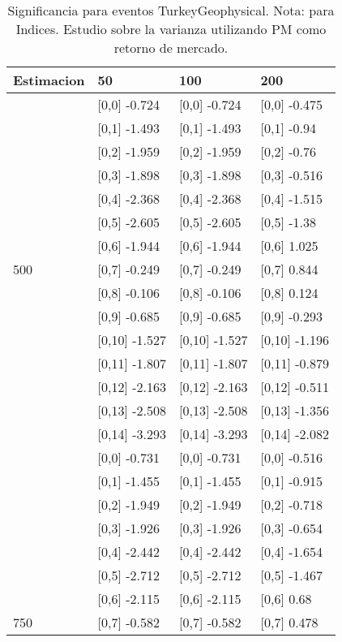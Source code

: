 \begin{table}

\caption{Significancia para eventos TurkeyGeophysical. Nota: para Indices. Estudio sobre la varianza utilizando PM como retorno de mercado.}
\centering
\begin{tabular}[t]{llll}
\toprule
Estimacion & 50 & 100 & 200\\
\midrule
 & {}[0,0] -0.724 & {}[0,0] -0.724 & {}[0,0] -0.475\\
 & {}[0,1] -1.493 & {}[0,1] -1.493 & {}[0,1] -0.94\\
 & {}[0,2] -1.959 & {}[0,2] -1.959 & {}[0,2] -0.76\\
 & {}[0,3] -1.898 & {}[0,3] -1.898 & {}[0,3] -0.516\\
 & {}[0,4] -2.368 & {}[0,4] -2.368 & {}[0,4] -1.515\\
\addlinespace
 & {}[0,5] -2.605 & {}[0,5] -2.605 & {}[0,5] -1.38\\
 & {}[0,6] -1.944 & {}[0,6] -1.944 & {}[0,6] 1.025\\
500 & {}[0,7] -0.249 & {}[0,7] -0.249 & {}[0,7] 0.844\\
 & {}[0,8] -0.106 & {}[0,8] -0.106 & {}[0,8] 0.124\\
 & {}[0,9] -0.685 & {}[0,9] -0.685 & {}[0,9] -0.293\\
\addlinespace
 & {}[0,10] -1.527 & {}[0,10] -1.527 & {}[0,10] -1.196\\
 & {}[0,11] -1.807 & {}[0,11] -1.807 & {}[0,11] -0.879\\
 & {}[0,12] -2.163 & {}[0,12] -2.163 & {}[0,12] -0.511\\
 & {}[0,13] -2.508 & {}[0,13] -2.508 & {}[0,13] -1.356\\
 & {}[0,14] -3.293 & {}[0,14] -3.293 & {}[0,14] -2.082\\
\addlinespace
 & {}[0,0] -0.731 & {}[0,0] -0.731 & {}[0,0] -0.516\\
 & {}[0,1] -1.455 & {}[0,1] -1.455 & {}[0,1] -0.915\\
 & {}[0,2] -1.949 & {}[0,2] -1.949 & {}[0,2] -0.718\\
 & {}[0,3] -1.926 & {}[0,3] -1.926 & {}[0,3] -0.654\\
 & {}[0,4] -2.442 & {}[0,4] -2.442 & {}[0,4] -1.654\\
\addlinespace
 & {}[0,5] -2.712 & {}[0,5] -2.712 & {}[0,5] -1.467\\
 & {}[0,6] -2.115 & {}[0,6] -2.115 & {}[0,6] 0.68\\
750 & {}[0,7] -0.582 & {}[0,7] -0.582 & {}[0,7] 0.478\\

\end{tabular}
\end{table}
